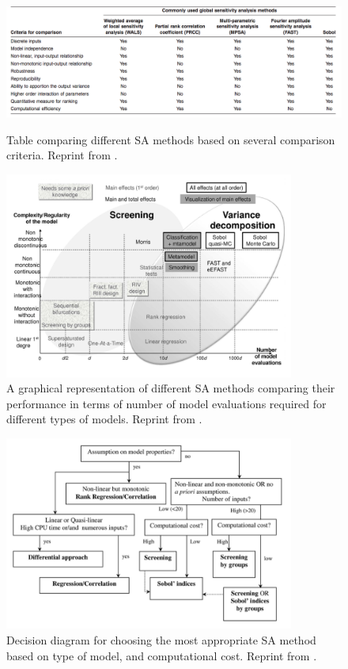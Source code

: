 \documentclass[12pt]{article}
\begin{document}
{\begin{figure}[!ht]
	\centering
	\caption{Table comparing different SA methods based on several comparison criteria. Reprint from \cite{iooss:hal-00975701}.}
	\includegraphics[width=1\textwidth]{images/SA_methods_table.png}
	\label{fig:SA_methods_table}
\end{figure}

\begin{figure}[!ht]
	\centering
	\includegraphics[width=0.85\textwidth]{images/SA_method_chart.png}
	\caption{A graphical representation of different SA methods comparing their performance in terms of number of model evaluations required for different types of models. Reprint from \cite{iooss:hal-00975701}.}
	\label{fig:SA_method_chart}
\end{figure}

\begin{figure}[!ht]
	\centering
	\includegraphics[width=0.85\textwidth]{images/SA_method_selection.png}
	\caption{Decision diagram for choosing the most appropriate SA method based on type of model, and computational cost.  Reprint from \cite{Rocquigny}.}
	\label{fig:SA_method_selection}
\end{figure}

}
\end{document}
